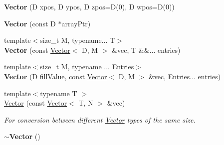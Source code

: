 \begin{Indent}
\begin{DoxyCompactItemize}
\item 
\mbox{\label{classrev_1_1_vector_afbb2f41c0f56d90a437bea89f877df1f}} 
{\bfseries Vector} (D xpos, D ypos, D zpos=D(0), D wpos=D(0))
\item 
\mbox{\label{classrev_1_1_vector_a2f0e9fbe22fb33e247279d78b74c6cac}} 
{\bfseries Vector} (const D $\ast$array\+Ptr)
\item 
\mbox{\label{classrev_1_1_vector_a4eb8fcbc2911ab24abfe6e076cec7b9d}} 
{\footnotesize template$<$size\+\_\+t M, typename... T$>$ }\\{\bfseries Vector} (const \mbox{\hyperlink{classrev_1_1_vector}{Vector}}$<$ D, M $>$ \&vec, T \&\&... entries)
\item 
\mbox{\label{classrev_1_1_vector_ad7e99ffecd0b92dcff0b1fabd551d236}} 
{\footnotesize template$<$size\+\_\+t M, typename ... Entries$>$ }\\{\bfseries Vector} (D fill\+Value, const \mbox{\hyperlink{classrev_1_1_vector}{Vector}}$<$ D, M $>$ \&vec, Entries... entries)
\item 
{\footnotesize template$<$typename T $>$ }\\\mbox{\hyperlink{classrev_1_1_vector_a622a7a8ae9b9a9fc7b87e662aadccecb}{Vector}} (const \mbox{\hyperlink{classrev_1_1_vector}{Vector}}$<$ T, N $>$ \&vec)
\begin{DoxyCompactList}\small\item\em For conversion between different \mbox{\hyperlink{classrev_1_1_vector}{Vector}} types of the same size. \end{DoxyCompactList}\item 
\mbox{\label{classrev_1_1_vector_adc6ceb220472545933eca270f7f85a0b}} 
{\bfseries $\sim$\+Vector} ()
\end{DoxyCompactItemize}
\end{Indent}
